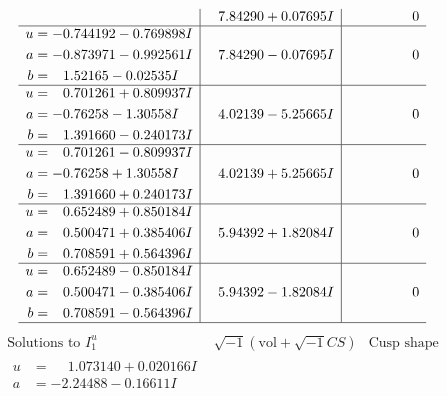 \documentclass[1p]{elsarticle_modified}
\theoremstyle{definition}
\newcommand{\I}{\sqrt{-1}}
\begin{document}
$$\begin{array}{c|c|c}
 & \phantom{-}7.84290 + 0.07695 I & \phantom{-0.000000 } 0 \\ \hline\begin{aligned}
u &= -0.744192 - 0.769898 I \\
a &= -0.873971 - 0.992561 I \\
b &= \phantom{-}1.52165 - 0.02535 I\end{aligned}
 & \phantom{-}7.84290 - 0.07695 I & \phantom{-0.000000 } 0 \\ \hline\begin{aligned}
u &= \phantom{-}0.701261 + 0.809937 I \\
a &= -0.76258 - 1.30558 I \\
b &= \phantom{-}1.391660 - 0.240173 I\end{aligned}
 & \phantom{-}4.02139 - 5.25665 I & \phantom{-0.000000 } 0 \\ \hline\begin{aligned}
u &= \phantom{-}0.701261 - 0.809937 I \\
a &= -0.76258 + 1.30558 I \\
b &= \phantom{-}1.391660 + 0.240173 I\end{aligned}
 & \phantom{-}4.02139 + 5.25665 I & \phantom{-0.000000 } 0 \\ \hline\begin{aligned}
u &= \phantom{-}0.652489 + 0.850184 I \\
a &= \phantom{-}0.500471 + 0.385406 I \\
b &= \phantom{-}0.708591 + 0.564396 I\end{aligned}
 & \phantom{-}5.94392 + 1.82084 I & \phantom{-0.000000 } 0 \\ \hline\begin{aligned}
u &= \phantom{-}0.652489 - 0.850184 I \\
a &= \phantom{-}0.500471 - 0.385406 I \\
b &= \phantom{-}0.708591 - 0.564396 I\end{aligned}
 & \phantom{-}5.94392 - 1.82084 I & \phantom{-0.000000 } 0\\
 \hline 
 \end{array}$$\newpage$$\begin{array}{c|c|c}  
\text{Solutions to }I^u_{1}& \I (\text{vol} + \sqrt{-1}CS) & \text{Cusp shape}\\
 \hline 
\begin{aligned}
u &= \phantom{-}1.073140 + 0.020166 I \\
a &= -2.24488 - 0.16611 I \\

\end{aligned}
\end{array}$$
\end{document}
